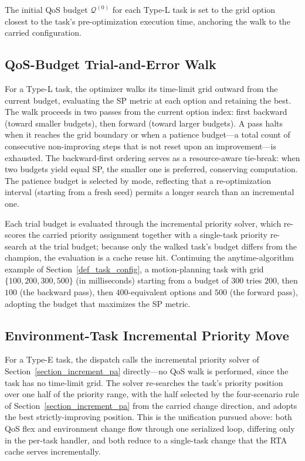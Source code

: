     The initial QoS budget $\boldsymbol{\mathcal{Q}}^{(0)}$ for each Type-L task is set to the grid option closest to the task's pre-optimization execution time, anchoring the walk to the carried configuration.

    \subsection{QoS-Budget Trial-and-Error Walk}
    \label{section_qos_walk}

    For a Type-L task, the optimizer walks its time-limit grid outward from the current budget, evaluating the SP metric at each option and retaining the best.
    The walk proceeds in two passes from the current option index: first backward (toward smaller budgets), then forward (toward larger budgets).
    A pass halts when it reaches the grid boundary or when a patience budget---a total count of consecutive non-improving steps that is not reset upon an improvement---is exhausted.
    The backward-first ordering serves as a resource-aware tie-break: when two budgets yield equal SP, the smaller one is preferred, conserving computation.
    The patience budget is selected by mode, reflecting that a re-optimization interval (starting from a fresh seed) permits a longer search than an incremental one.

    Each trial budget is evaluated through the incremental priority solver, which re-scores the carried priority assignment together with a single-task priority re-search at the trial budget; because only the walked task's budget differs from the champion, the evaluation is a cache reuse hit.
    Continuing the anytime-algorithm example of Section~\ref{def_task_config}, a motion-planning task with grid $\{100, 200, 300, 500\}$ (in milliseconds) starting from a budget of $300$ tries $200$, then $100$ (the backward pass), then $400$-equivalent options and $500$ (the forward pass), adopting the budget that maximizes the SP metric.

    \subsection{Environment-Task Incremental Priority Move}
    \label{section_env_pa_move}

    For a Type-E task, the dispatch calls the incremental priority solver of Section~\ref{section_increment_pa} directly---no QoS walk is performed, since the task has no time-limit grid.
    The solver re-searches the task's priority position over one half of the priority range, with the half selected by the four-scenario rule of Section~\ref{section_increment_pa} from the carried change direction, and adopts the best strictly-improving position.
    This is the unification pursued above: both QoS flex and environment change flow through one serialized loop, differing only in the per-task handler, and both reduce to a single-task change that the RTA cache serves incrementally.


